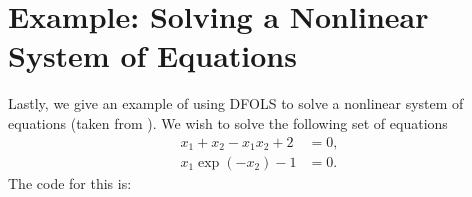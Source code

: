 \documentclass[letterpaper,10pt,english]{sphinxmanual}
\begin{document}
\section{Example: Solving a Nonlinear System of Equations}
\label{\detokenize{userguide:example-solving-a-nonlinear-system-of-equations}}
Lastly, we give an example of using DFO\sphinxhyphen{}LS to solve a nonlinear system of equations (taken from ). We wish to solve the following set of equations
\begin{equation*}
\begin{split}x_1 + x_2 - x_1 x_2 + 2 &= 0, \\
x_1 \exp(-x_2) - 1 &= 0.\end{split}
\end{equation*}
The code for this is:
\end{document}
